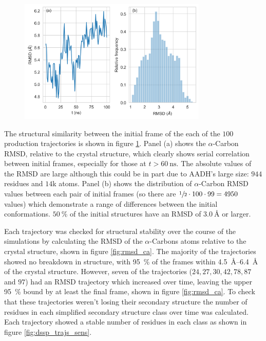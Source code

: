 \begin{figure}
    \centering
    \includegraphics[width=0.8\textwidth]{chapters/aadh/figures/rmsd_seed_trajectory.png}
    \label{fig:rmsd_seed_traj}
\end{figure}

 The structural similarity between the initial frame of the each of the $100$ production trajectories is shown in figure \ref{fig:rmsd_seed_traj}. Panel (a) shows the $\alpha$-Carbon RMSD, relative to the crystal structure, which clearly shows serial correlation between initial frames, especially for those at $t>\SI{60}{\nano\second}$. The absolute values of the RMSD are large although this could be in part due to AADH's large size: $944$ residues and $14$k atoms. Panel (b) shows the distribution of $\alpha$-Carbon RMSD values between each pair of initial frames (so there are $\sfrac{1}{2}\cdot 100\cdot 99 = 4950$ values) which demonstrate a range of differences between the initial conformations. $\SI{50}{\percent}$ of the initial structures have an RMSD of $\SI{3.0}{\angstrom}$ or larger.  

Each trajectory was checked for structural stability over the course of the simulations by calculating the RMSD of the $\alpha$-Carbons atoms relative to the crystal structure, shown in figure \ref{fig:rmsd_ca}. The majority of the trajectories showed no breakdown in structure, with  \SI{95}{\percent} of the frames within \SIrange{4.5}{6.4}{\angstrom} of the crystal structure. However, seven of the trajectories ($24, 27, 30, 42, 78, 87$ and $97$) had an RMSD trajectory which increased over time, leaving the upper \SI{95}{\percent} bound by at least the final frame, shown in figure \ref{fig:rmsd_ca}. To check that these trajectories weren't losing their secondary structure the number of residues in each simplified secondary structure class \cite{kabschDictionaryProteinSecondary1983} over time was calculated. Each trajectory showed a stable number of residues in each class as shown in figure \ref{fig:dssp_trajs_sens}.

